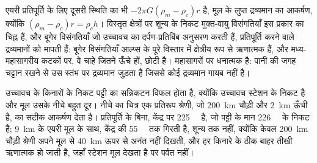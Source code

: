 एयरी प्रतिपूर्ति के लिए दूसरी स्थिति का  भी $-2\pi G(\rho_m - \rho_c)r$ है, मूल के लुप्त द्रव्यमान का आकर्षण, क्योंकि $(\rho_m - \rho_c)r = \rho_c h$। विस्तृत क्षेत्रों पर शून्य के निकट मुक्त-वायु विसंगतियाँ इस प्रकार  का चिह्न हैं, और बूगेर विसंगतियाँ जो उच्चावच का दर्पण-प्रतिबिंब अनुसरण करती हैं, प्रतिपूर्ति करने वाले द्रव्यमानों को मापती हैं: बूगेर विसंगतियाँ आल्प्स के पूरे विस्तार में क्षेत्रीय रूप से ऋणात्मक हैं, और मध्य-महासागरीय कटकों पर, वे चाहे जितने ऊँचे हों,  छोटी है। महासागरों पर  धनात्मक है: पानी की जगह चट्टान रखने से उस स्तंभ पर द्रव्यमान जुड़ता है जिससे कोई द्रव्यमान गायब नहीं है।

उच्चावच के किनारों के निकट पट्टी का सन्निकटन विफल होता है, क्योंकि उच्चावच स्टेशन के निकट है और मूल उसके नीचे बहुत दूर। नीचे का चित्र एक प्रतिरूप श्रेणी, जो \qty{200}{km} चौड़ी और \qty{2}{km} ऊँची है, का सटीक आकर्षण देता है। प्रतिपूर्ति के बिना,  केंद्र पर \qty{+225}{\milli\gal} है, जो पट्टी के मान \qty{226}{\milli\gal} के निकट है; \qty{9}{km} के एयरी मूल के साथ, केंद्र की  \qty{+55}{\milli\gal} तक गिरती है, शून्य तक नहीं, क्योंकि केवल \qty{200}{km} चौड़ी श्रेणी अपने मूल से \qty{40}{km} ऊपर से अनंत नहीं दिखती, और  हर किनारे के ठीक बाहर तीखी ऋणात्मक हो जाती है, जहाँ स्टेशन मूल देखता है पर पर्वत नहीं।


